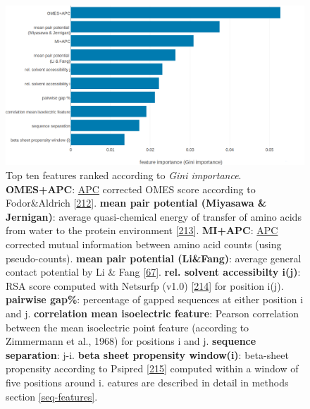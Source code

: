 \documentclass[11pt,a4paper,twoside]{book}
\theoremstyle{definition}
\theoremstyle{definition}
\theoremstyle{remark}
\begin{document}
\begin{figure}
\includegraphics[width=1\linewidth]{img/random_forest_contact_prior/feature_random_forest_optimalhyperparameters_topfeatures} \caption{Top ten features ranked according to
\emph{Gini importance}. \textbf{OMES+APC}:
\protect\hyperlink{abbrev}{APC} corrected OMES score according to
Fodor\&Aldrich {[}\protect\hyperlink{ref-Fodor2004a}{212}{]}.
\textbf{mean pair potential (Miyasawa \& Jernigan)}: average
quasi-chemical energy of transfer of amino acids from water to the
protein environment {[}\protect\hyperlink{ref-Miyazawa1999a}{213}{]}.
\textbf{MI+APC}: \protect\hyperlink{abbrev}{APC} corrected mutual
information between amino acid counts (using pseudo-counts).
\textbf{mean pair potential (Li\&Fang)}: average general contact
potential by Li \& Fang {[}\protect\hyperlink{ref-Li2011}{67}{]}.
\textbf{rel. solvent accessibilty i(j)}: RSA score computed with
Netsurfp (v1.0) {[}\protect\hyperlink{ref-Petersen2009a}{214}{]} for
position i(j). \textbf{pairwise gap\%}: percentage of gapped sequences
at either position i and j. \textbf{correlation mean isoelectric
feature}: Pearson correlation between the mean isoelectric point feature
(according to Zimmermann et al., 1968) for positions i and j.
\textbf{sequence separation}: \textbar{}j-i\textbar{}. \textbf{beta
sheet propensity window(i)}: beta-sheet propensity according to Psipred
{[}\protect\hyperlink{ref-Jones1999}{215}{]} computed within a window of
five positions around i. eatures are described in detail in methods
section \ref{seq-features}.}\label{fig:rf-feature-importance}
\end{figure}
\end{document}
